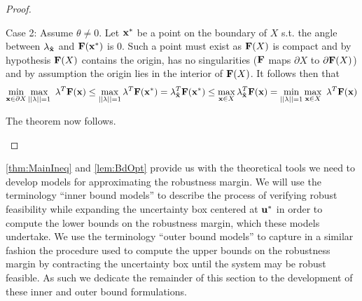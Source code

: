 \begin{thm}
\begin{proof}
\begin{itemize}
Case 2: Assume $\theta \neq 0$. 
Let $\bold{x^*}$ be a point on the boundary of $X$ s.t. the angle between $\bold{\lambda}_{\bold{\hat{x}}}$ and $\bold{F}(\bold{x^*})$ is 0. 
Such a point must exist as $\bold{F}(X)$ is compact and by hypothesis $\bold{F}(X)$ contains the origin, has no singularities ($\bold{F}$ maps $\partial X$ to $\partial \bold{F}(X)$) and by assumption the origin lies in the interior of $\bold{F}(X)$. 
It follows then that $$\min\limits_{\bold x\in \partial X}\max\limits_{||\bold{\lambda}||=1}\ \bold{\lambda}^T\bold{F}(\bold x)\leq \max\limits_{||\bold{\lambda}||=1}\bold{\lambda}^T \bold{F}(\bold{x^*}) =\bold{\lambda}_{\bold{\hat{x}}}^T\bold{F}(\bold{x^*})\leq \max\limits_{\bold x\in X}\bold{\lambda}_{\bold{\hat{x}}}^T\bold{F}(\bold x)=\min\limits_{||\bold{\lambda}||=1}\max\limits_{\bold x\in X}\ \bold{\lambda}^T\bold{F}(\bold x)$$

The theorem now follows.
\end{itemize}
\end{proof}
\end{thm}

\cref{thm:MainIneq} and \cref{lem:BdOpt} provide us with the theoretical tools we need to develop models for approximating the robustness margin.
We will use the terminology \enquote{inner bound models} to describe the process of verifying robust feasibility while expanding the uncertainty box centered at $\bold u^*$ in order to compute the lower bounds on the robustness margin, which these models undertake. 
We use the terminology \enquote{outer bound models} to capture in a similar fashion the procedure used to compute the upper bounds on the robustness margin by contracting the uncertainty box until the system may be robust feasible. 
As such we dedicate the remainder of this section to the development of these inner and outer bound formulations. 
